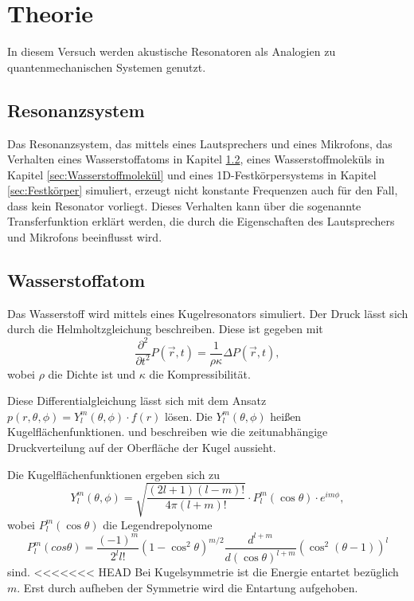 \section{Theorie}
\label{sec:Theorie}

In diesem Versuch werden akustische Resonatoren als Analogien zu quantenmechanischen Systemen genutzt. 

\subsection{Resonanzsystem}

Das Resonanzsystem, das mittels eines Lautsprechers und eines Mikrofons, das Verhalten eines Wasserstoffatoms in Kapitel \ref{sec:Wasserstoff}, eines Wasserstoffmoleküls in Kapitel \ref{sec:Wasserstoffmolekül} und eines 1D-Festkörpersystems in Kapitel \ref{sec:Festkörper} simuliert, erzeugt nicht konstante Frequenzen auch für den Fall, dass kein Resonator vorliegt.
Dieses Verhalten kann über die sogenannte Transferfunktion erklärt werden, die durch die Eigenschaften des Lautsprechers und Mikrofons beeinflusst wird. 


\subsection{Wasserstoffatom}
\label{sec:Wasserstoff}
Das Wasserstoff wird mittels eines Kugelresonators simuliert. Der Druck lässt sich durch die Helmholtzgleichung beschreiben. 
Diese ist gegeben mit 
\begin{equation*}
    \frac{\partial^2}{\partial t^2} P(\vec r,t) = \frac{1}{\rho\kappa} \Delta P(\vec r,t),
\end{equation*}
wobei $\rho$ die Dichte ist und $\kappa$ die Kompressibilität. 

Diese Differentialgleichung lässt sich mit dem Ansatz $p(r, \theta, \phi) = Y^m_l(\theta, \phi) \cdot f(r)$ lösen.
Die $Y^m_l(\theta, \phi)$ heißen Kugelflächenfunktionen. und beschreiben wie die zeitunabhängige Druckverteilung auf der Oberfläche der Kugel aussieht. 

Die Kugelflächenfunktionen ergeben sich zu 
\begin{equation*}
    Y^m_l (\theta, \phi) = \sqrt{\frac{(2l+1)(l-m)!}{4\pi(l+m)!}} \cdot P^m_l(\cos \theta) \cdot e^{i m \phi},
\end{equation*}
wobei $P^m_l(\cos \theta)$ die Legendrepolynome 
\begin{equation*}
P^m_l(cos \theta) = \frac{(-1)^m}{2^l l!} (1- \cos^2 \theta)^{m/2} \frac{d^{l+m}}{d(\cos \theta)^{l+m}} (\cos^2 (\theta -1))^l
\end{equation*}
sind.
<<<<<<< HEAD
Bei Kugelsymmetrie ist die Energie entartet bezüglich $m$. 
Erst durch aufheben der Symmetrie wird die Entartung aufgehoben.  


